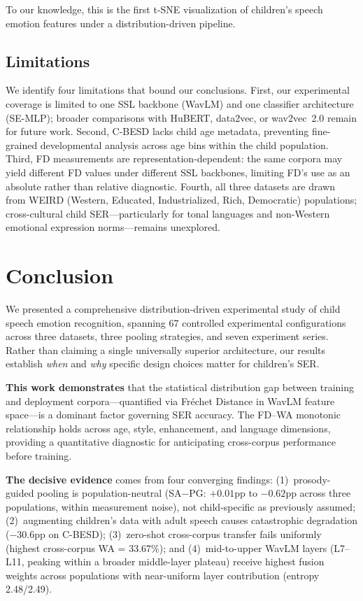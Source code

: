 \documentclass[11pt,a4paper]{article}
\begin{document}
To our knowledge, this is the first t-SNE visualization of children's speech
emotion features under a distribution-driven pipeline.

\subsection{Limitations}

We identify four limitations that bound our conclusions. First, our
experimental coverage is limited to one SSL backbone (WavLM) and one classifier
architecture (SE-MLP); broader comparisons with HuBERT, data2vec, or wav2vec~2.0
remain for future work. Second, C-BESD lacks child age metadata, preventing
fine-grained developmental analysis across age bins within the child population.
Third, FD measurements are representation-dependent: the same corpora may yield
different FD values under different SSL backbones, limiting FD's use as an
absolute rather than relative diagnostic. Fourth, all three datasets are drawn
from WEIRD (Western, Educated, Industrialized, Rich, Democratic) populations;
cross-cultural child SER---particularly for tonal languages and non-Western
emotional expression norms---remains unexplored.


\section{Conclusion}
\label{sec:conclusion}

We presented a comprehensive distribution-driven experimental study of child
speech emotion recognition, spanning 67 controlled experimental configurations
across three datasets, three pooling strategies, and seven experiment series.
Rather than claiming a single universally superior architecture, our results
establish \textit{when} and \textit{why} specific design choices matter for
children's SER.

\textbf{This work demonstrates} that the statistical distribution gap between
training and deployment corpora---quantified via Fr\'{e}chet Distance in WavLM
feature space---is a dominant factor governing SER accuracy. The FD--WA
monotonic relationship holds across age, style, enhancement, and language
dimensions, providing a quantitative diagnostic for anticipating cross-corpus
performance before training.

\textbf{The decisive evidence} comes from four converging findings:
(1)~prosody-guided pooling is population-neutral (SA$-$PG: $+0.01$pp to
$-0.62$pp across three populations, within measurement noise), not
child-specific as previously assumed; (2)~augmenting children's data with adult
speech causes catastrophic degradation ($-30.6$pp on C-BESD); (3)~zero-shot
cross-corpus transfer fails uniformly (highest cross-corpus WA = 33.67\%); and
(4)~mid-to-upper WavLM layers (L7--L11, peaking within a broader
middle-layer plateau) receive highest fusion weights across
populations with near-uniform layer contribution (entropy 2.48/2.49).
\end{document}
